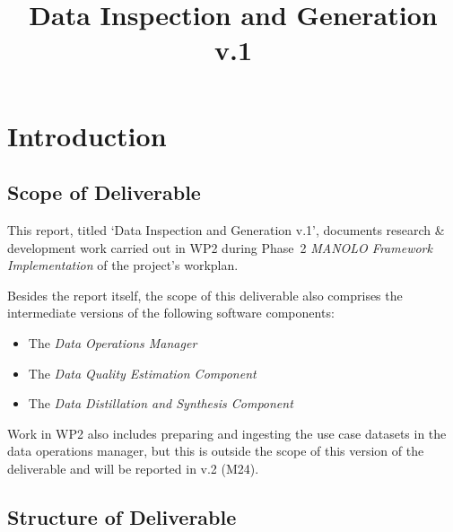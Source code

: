 \documentclass{report}
\title{Data Inspection and Generation v.1}
\newcommand{\quotes}[1]{`#1'}
\begin{document}
\maketitle

\chapter{Introduction}

\section{Scope of Deliverable}

This report, titled \quotes{Data Inspection and Generation v.1},
documents research \& development work carried out in WP2 during
Phase~2 \emph{MANOLO Framework Implementation} of the project's
workplan.

Besides the report itself, the scope of this deliverable also comprises
the intermediate versions of the following software components:
%
\begin{itemize}
\item The \emph{Data Operations Manager}
\item The \emph{Data Quality Estimation Component}
\item The \emph{Data Distillation and Synthesis Component}
\end{itemize}

Work in WP2 also includes preparing and ingesting the use case
datasets in the data operations manager, but this is outside the scope
of this version of the deliverable and will be reported in v.2 (M24).

\section{Structure of Deliverable}
\end{document}
